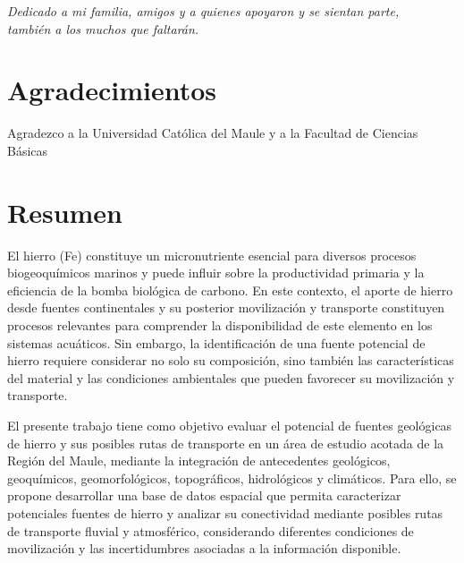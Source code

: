 
\thispagestyle{empty}
\vspace*{5cm}
\begin{flushright}
    \textit{Dedicado a mi familia, amigos y a quienes apoyaron y se sientan parte, \\ también a los muchos que faltarán.}
\end{flushright}

\newpage

\section*{Agradecimientos}
Agradezco a la Universidad Católica del Maule y a la Facultad de Ciencias Básicas 

\newpage

\section*{Resumen}
El hierro (Fe) constituye un micronutriente esencial para diversos procesos biogeoquímicos marinos y puede influir sobre la productividad primaria y la eficiencia de la bomba biológica de carbono. En este contexto, el aporte de hierro desde fuentes continentales y su posterior movilización y transporte constituyen procesos relevantes para comprender la disponibilidad de este elemento en los sistemas acuáticos. Sin embargo, la identificación de una fuente potencial de hierro requiere considerar no solo su composición, sino también las características del material y las condiciones ambientales que pueden favorecer su movilización y transporte.

El presente trabajo tiene como objetivo evaluar el potencial de fuentes geológicas de hierro y sus posibles rutas de transporte en un área de estudio acotada de la Región del Maule, mediante la integración de antecedentes geológicos, geoquímicos, geomorfológicos, topográficos, hidrológicos y climáticos. Para ello, se propone desarrollar una base de datos espacial que permita caracterizar potenciales fuentes de hierro y analizar su conectividad mediante posibles rutas de transporte fluvial y atmosférico, considerando diferentes condiciones de movilización y las incertidumbres asociadas a la información disponible.

